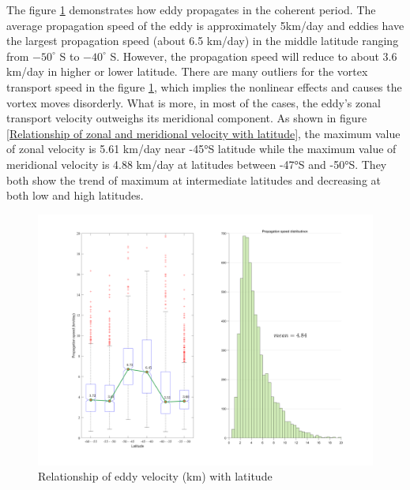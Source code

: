 The figure \ref{velocity vs latitude} demonstrates how eddy propagates in the coherent period. The average propagation speed of the eddy is approximately 5km/day and eddies have the largest propagation speed (about 6.5 km/day) in the middle latitude ranging from $-50^\circ$ S to $-40^\circ$ S. However, the propagation speed will reduce to about 3.6 km/day in higher or lower latitude. There are many outliers for the vortex transport speed in the figure \ref{velocity vs latitude}, which implies the nonlinear effects and causes the vortex moves disorderly. What is more, in most of the cases, the eddy's zonal transport velocity outweighs its meridional component. As shown in figure \ref{Relationship of zonal and meridional velocity with latitude}, the maximum value of zonal velocity is 5.61 km/day near -45°S latitude while the maximum value of meridional velocity is 4.88 km/day at latitudes between -47°S and -50°S. They both show the trend of maximum at intermediate latitudes and decreasing at both low and high latitudes.


\begin{figure}
    \centering
    \includegraphics[width = 1.0\textwidth]{chapter/figure/velocity vs latitude.png}
    \caption{Relationship of eddy velocity (km) with latitude}
    \label{velocity vs latitude}
\end{figure}

